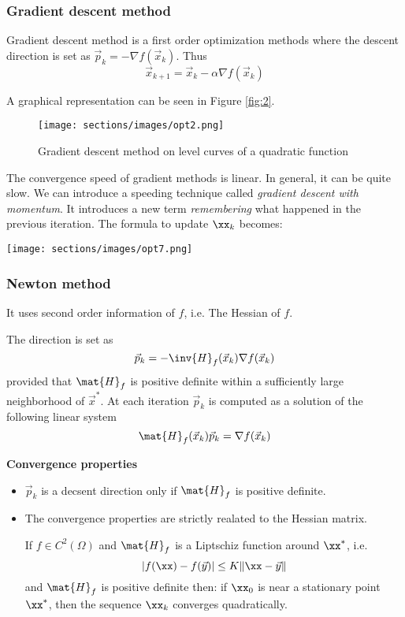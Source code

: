 \subsubsection{Gradient descent method }

Gradient descent method is a first order optimization methods where the descent direction 
 is set as $\vec{p}_k = -\nabla{f}(\vec{x}_k)$.
 Thus
$$ \vec{x}_{k+1} = \vec{x}_k - \alpha\nabla{f}(\vec{x}_k) $$

A graphical representation can be seen in Figure \ref{fig:2}.

\begin{figure}
\texttt{[image: sections/images/opt2.png]}
\caption{Gradient descent method on level curves of a quadratic function}
\label{fig:1}\end{figure}

The convergence speed of gradient methods is linear. In general, it can be quite slow.
 We can introduce a speeding technique called \textit{gradient descent with momentum}.
 It introduces a new term \textit{remembering} what happened in the previous iteration.
 The formula to update $\xx_k$ becomes:
 
\texttt{[image: sections/images/opt7.png]}

\subsubsection{Newton method}
It uses second order information of $f$, i.e. The Hessian of $f$.

The direction is set as
$$ \vec{p}_k = -\inv{H}_f(\vec{x}_k)\nabla{f}(\vec{x}_k) $$
provided that $\mat{H}_f$ is positive definite within a sufficiently large neighborhood of $\vec{x}^*$. At each iteration $\vec{p}_k$ is computed as a solution of the following linear system
$$ \mat{H}_f(\vec{x}_k)\vec{p}_k = \nabla{f}(\vec{x}_k) $$

\textbf{Convergence properties}
\begin{itemize}
    \item $\vec{p}_k$ is a decsent direction only if $\mat{H}_f$ is positive definite.
    \item The convergence properties are strictly realated to the Hessian matrix.
    \begin{proposition}
        If $f \in C^2(\Omega)$  and $\mat{H}_f$ is a Liptschiz function around $\xx^*$, i.e.
        $$|f(\xx) -f(\vec{y})| \leq K \|\xx-\vec{y} \|$$
        and $\mat{H}_f$ is positive definite then:
      if $\xx_0$ is near a stationary point $\xx^*$, then the sequence $\xx_k$ converges quadratically.
    \end{proposition}
    
\end{itemize}


